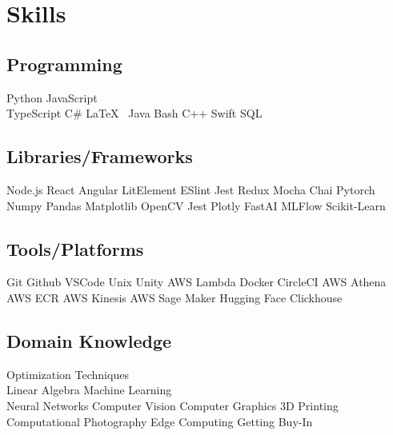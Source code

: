 \documentclass[]{plushcv}
\begin{document}
\begin{minipage}[t]{0.25\textwidth}


    \section{Skills}
    \subsection{Programming}
    \sectionsep
    Python \textbullet{} 
    JavaScript \textbullet{} \\ 
    TypeScript \textbullet{} 
    C\# \textbullet{}
    \LaTeX\ \textbullet{}
    Java \textbullet{}  
    Bash \textbullet{}
    C++ \textbullet{} 
    Swift \textbullet{}
    SQL \textbullet{}
    \sectionsep{}
    \sectionsep{}
    \subsection{Libraries/Frameworks}
    \sectionsep{}
    Node.js \textbullet{}
    React \textbullet{}
    Angular \textbullet{}
    LitElement \textbullet{}
    ESlint \textbullet{} 
    Jest \textbullet{}
    Redux \textbullet{}
    Mocha \textbullet{} 
    Chai  \textbullet{} 
    Pytorch \textbullet{} 
    Numpy \textbullet{} 
    Pandas \textbullet{} 
    Matplotlib \textbullet{} 
    OpenCV \textbullet {} 
    Jest \textbullet{} 
    Plotly \textbullet{}
    FastAI \textbullet{}
    MLFlow \textbullet{}
    Scikit-Learn \textbullet{}
    \sectionsep{}
    \sectionsep{}
    \subsection{Tools/Platforms}
    \sectionsep{}
    Git \textbullet{} 
    Github \textbullet{}
    VSCode \textbullet{}  
    Unix \textbullet{}
    Unity \textbullet{} 
    AWS Lambda \textbullet{}
    Docker \textbullet{} 
    CircleCI \textbullet{} 
    AWS Athena \textbullet{}
    AWS ECR \textbullet{}
    AWS Kinesis \textbullet{}
    AWS Sage Maker \textbullet{}
    Hugging Face \textbullet{}
    Clickhouse \textbullet{}
    \sectionsep{}
    \sectionsep{}
    \subsection{Domain Knowledge}
    \sectionsep
    Optimization Techniques \textbullet{} \\
    Linear Algebra \textbullet{}
    Machine Learning \textbullet{} \\ Neural Networks \textbullet{}
    Computer Vision \textbullet{} Computer Graphics \textbullet{} 3D Printing
    \textbullet{} Computational Photography \textbullet{} Edge Computing \textbullet{}
    Getting Buy-In \textbullet{}
    \sectionsep


\end{minipage}
\end{document}
